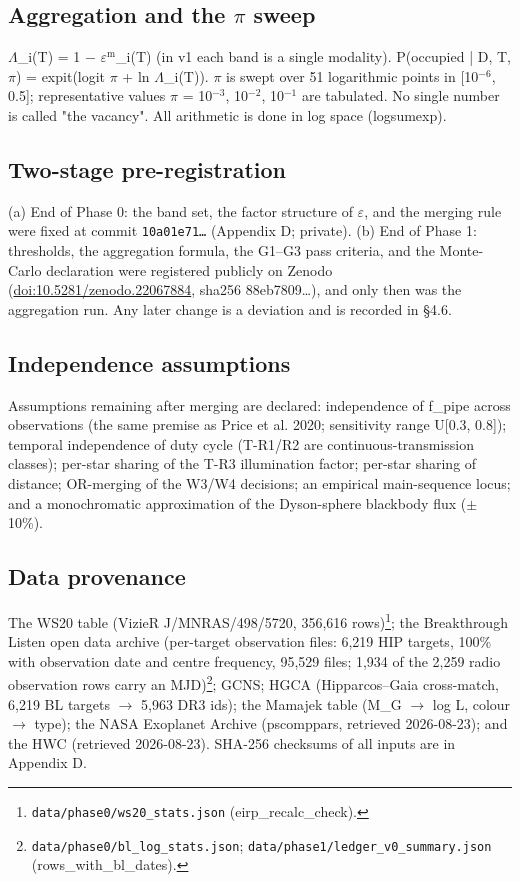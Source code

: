 \documentclass{aa}
\begin{document}
\subsection{Aggregation and the \(\pi\) sweep}
\noindent \(\Lambda\)\_i(T) = 1 \(-\) \(\varepsilon\)\(^{\mathrm{m}}\)\_i(T) (in v1 each band is a single modality). P(occupied | D, T, \(\pi\)) = expit(logit \(\pi\) + ln \(\Lambda\)\_i(T)). \(\pi\) is swept over 51 logarithmic points in [10\(^{-6}\), 0.5]; representative values \(\pi\) = 10\(^{-3}\), 10\(^{-2}\), 10\(^{-1}\) are tabulated. No single number is called "the vacancy". All arithmetic is done in log space (logsumexp).\par\smallskip

\subsection{Two-stage pre-registration}
\noindent (a) End of Phase 0: the band set, the factor structure of \(\varepsilon\), and the merging rule were fixed at commit \texttt{10a01e71…} (Appendix D; private). (b) End of Phase 1: thresholds, the aggregation formula, the G1--G3 pass criteria, and the Monte-Carlo declaration were registered publicly on Zenodo (\url{doi:10.5281/zenodo.22067884}, sha256 88eb7809\ldots{}), and only then was the aggregation run. Any later change is a deviation and is recorded in \S{}4.6.\par\smallskip

\subsection{Independence assumptions}
\noindent Assumptions remaining after merging are declared: independence of f\_pipe across observations (the same premise as Price et al. 2020; sensitivity range U[0.3, 0.8]); temporal independence of duty cycle (T-R1/R2 are continuous-transmission classes); per-star sharing of the T-R3 illumination factor; per-star sharing of distance; OR-merging of the W3/W4 decisions; an empirical main-sequence locus; and a monochromatic approximation of the Dyson-sphere blackbody flux (\(\pm\)10\%).\par\smallskip

\subsection{Data provenance}
\noindent The WS20 table (VizieR J/MNRAS/498/5720, 356,616 rows)\footnote{\texttt{data/phase0/ws20\_stats.json} (eirp\_recalc\_check).}; the Breakthrough Listen open data archive (per-target observation files: 6,219 HIP targets, 100\% with observation date and centre frequency, 95,529 files; 1,934 of the 2,259 radio observation rows carry an MJD)\footnote{\texttt{data/phase0/bl\_log\_stats.json}; \texttt{data/phase1/ledger\_v0\_summary.json} (rows\_with\_bl\_dates).}; GCNS; HGCA (Hipparcos--Gaia cross-match, 6,219 BL targets \(\rightarrow\) 5,963 DR3 ids); the Mamajek table (M\_G \(\rightarrow\) log L, colour \(\rightarrow\) type); the NASA Exoplanet Archive (pscomppars, retrieved 2026-08-23); and the HWC (retrieved 2026-08-23). SHA-256 checksums of all inputs are in Appendix D.\par\smallskip
\end{document}
